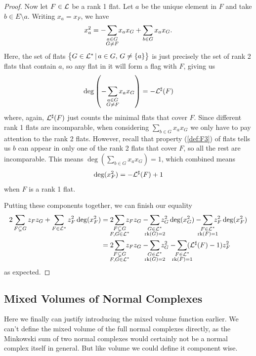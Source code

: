 \documentclass[12pt,oneside]{../../sfsuthesis}
\begin{document}
\begin{proof}
    Now let \( F \in \mathcal{L} \) be a rank 1 flat. Let \( a \) be the unique element in \( F \) and take \( b \in E \setminus a \).
    Writing \( x_a = x_F \), we have
    \[
        x_a^2 = - \sum_{\mathclap{\substack{a \in G \\ G \neq F}}}x_a x_G + \sum_{b \in G} x_a x_G.
    \]
    Here, the set of flats \( \big\{ G \in \mathcal{L}^\ast \, | \, a \in G, \, G \neq \{ a \}\big\} \) is just precisely the set of rank 2 flats that contain \( a \), so any flat in it will form a flag with \( F \), giving us
    \[
        \deg \left( - \sum_{\mathclap{\substack{a \in G \\ G \neq F}}}x_a x_G \right) = -\cL^\sharp(F)
    \]
    where, again, \( \mathcal{L}^\sharp(F) \) just counts the minimal flats that cover \( F \).
    Since different rank 1 flats are incomparable, when considering \( \sum_{b \in G} x_a x_G \) we only have to pay attention to the rank 2 flats.
    However, recall that property (\ref{def:F3}) of flats tells us \( b \) can appear in only one of the rank 2 flats that cover \( F \), so all the rest are incomparable.
    This means \( \deg(\sum_{b \in G} x_a x_G) = 1 \), which combined means
    \[
        \deg(x_F^2) = - \mathcal{L}^\sharp(F) + 1
    \]
    when \( F \) is a rank 1 flat.

    Putting these components together, we can finish our equality
    \begin{align*}
        2 \sum_{F \subsetneq G} z_F z_{G} + \sum_{F \in \cL^\ast} z_F^2 \deg(x_F^2)
         & = 2\sum_{\mathclap{\substack{F \subsetneq G \\ F,G \in \cL^\ast}}} z_F z_G - \sum_{\mathclap{\substack{G \in \cL^\ast \\ \rk(G)=2}}} z_G^2\deg(x_G^2) - \sum_{\mathclap{\substack{F \in \cL^\ast \\ \rk(F)=1}}}z_F^2 \deg(x_F^2) \\
         & = 2\sum_{\mathclap{\substack{F \subsetneq G \\ F,G \in \cL^\ast}}} z_F z_G - \sum_{\mathclap{\substack{G \in \cL^\ast \\ \rk(G)=2}}} z_G^2 - \sum_{\mathclap{\substack{F \in \cL^\ast \\ \rk(F)=1}}}(\cL^\sharp(F) - 1)z_F^2
    \end{align*}
    as expected.
\end{proof}

\subsection{Mixed Volumes of Normal Complexes}
Here we finally can justify introducing the mixed volume function earlier.
We can't define the mixed volume of the full normal complexes directly, as the Minkowski sum of two normal complexes would certainly not be a normal complex itself in general.
But like volume we could define it component wise.
\end{document}
